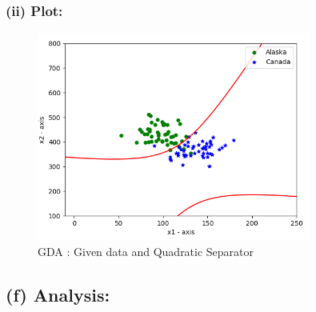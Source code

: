 \documentclass[a4 paper]{article}
\begin{document}
\subsubsection*{(ii) Plot:}

\begin{figure}[H]
	\centering
	  \includegraphics[width = 90mm]{./Plots/4b.png}
	  \caption{GDA : Given data and Quadratic Separator}
  	\label{fig8}
\end{figure}

\subsection*{(f) Analysis:}
\end{document}
